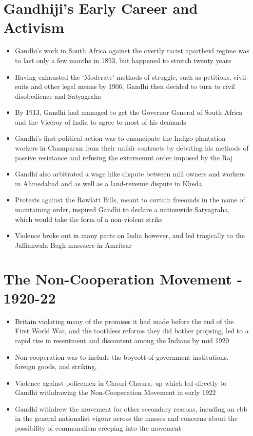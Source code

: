 \section{Gandhiji’s Early Career and Activism}
\begin{itemize}
    \item Gandhi's work in South Africa against the overtly racist apartheid regime was to last only a few months in 1893, but happened to stretch twenty years
    \item Having exhausted the `Moderate' methods of struggle, such as petitions, civil suits and other legal means by 1906, Gandhi then decided to turn to civil disobedience and Satyagraha
    \item By 1913, Gandhi had managed to get the Governor General of South Africa and the Viceroy of India to agree to most of his demands
    \item Gandhi's first political action was to emancipate the Indigo plantation workers in Champaran from their unfair contracts by debuting his methods of passive resistance and refusing the externemnt order imposed by the Raj
    \item Gandhi also arbitrated a wage hike dispute between mill owners and workers in Ahmedabad and as well as a land-revenue dispute in Kheda
    \item Protests against the Rowlatt Bills, meant to curtain freeomds in the name of maintaining order, inspired Gandhi to declare a nationwide Satyagraha, which would take the form of a non-violent strike
    \item Violence broke out in many parts on India however, and led tragically to the Jallianwala Bagh massacre in Amritsar
\end{itemize}

\section{The Non-Cooperation Movement - 1920-22}
\begin{itemize}
    \item Britain violating many of the promises it had made before the end of the First World War, and the toothless reforms they did bother propsing, led to a rapid rise in resentment and discontent among the Indians by mid 1920
    \item Non-cooperation was to include the boycott of government institutions, foreign goods, and striking,
    \item Violence against policemen in Chauri-Chaura, \gls{up} which led directly to Gandhi withdrawing the Non-Cooperation Movement in early 1922
    \item Gandhi withdrew the movement for other secondary reasons, incuding an ebb in the general nationalist vigour across the masses and concerns about the possibility of communalism creeping into the movement
\end{itemize}

